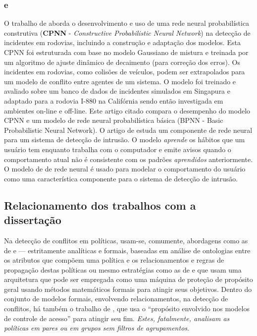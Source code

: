 \subsubsection{ e }
O trabalho de  aborda o desenvolvimento e uso de uma rede neural probabilística construtiva (\textbf{CPNN} - \textit{Constructive Probabilistic Neural Network}) na detecção de incidentes em rodovias, incluindo a construção e adaptação dos modelos. Esta CPNN foi estruturada com base no modelo Gaussiano de mistura e treinada por um algoritmo de ajuste dinâmico de decaimento (para correção dos erros). Os incidentes em rodovias, como colisões de veículos, podem ser extrapolados para um modelo de conflito entre agentes de um sistema. O modelo foi treinado e avaliado sobre um banco de dados de incidentes simulados em Singapura e adaptado para a rodovia I-880 na Califórnia sendo então investigada em ambientes on-line e off-line. Este artigo citado compara o desempenho do modelo CPNN e um modelo de rede neural probabilística básica (BPNN - Basic Probabilistic Neural Network). O artigo de  estuda um componente de rede neural para um sistema de detecção de intrusão. O modelo \textit{aprende} os hábitos que um usuário tem enquanto trabalha com o computador e emite avisos quando o comportamento atual não é consistente com os padrões \textit{aprendidos} anteriormente. O modelo de de rede neural  é usado para modelar o comportamento do usuário como uma característica componente para o sistema de detecção de intrusão.

\subsection{Relacionamento dos trabalhos com a dissertação}
Na detecção de conflitos em políticas, usam-se, comumente, abordagens como as de  e  --- estritamente analíticas e formais, baseadas em análise de ontologias entre os atributos que compõem uma política e os relacionamentos e regras de propagação destas políticas ou mesmo estratégias como as de  e  que usam uma arquitetura que pode ser empregada como uma máquina de proteção de propósito geral usando métodos matemáticos formais para atingir seus objetivos. Dentro do conjunto de modelos formais, envolvendo relacionamentos, na detecção de conflitos, há também o trabalho de , que usa o ``propósito envolvido nos modelos de controle de acesso'' para atingir seu fim. \textit{Estes, fatalmente, analisam as políticas em pares ou em grupos sem filtros de agrupamentos}.

